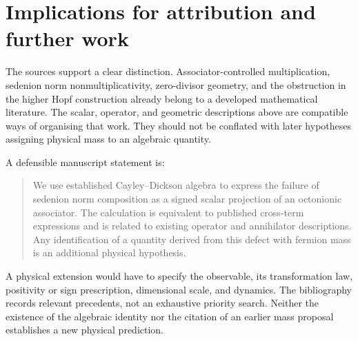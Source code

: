 \documentclass[11pt,a4paper]{article}
\numberwithin{equation}{section}
\begin{document}
\section{Implications for attribution and further work}

The sources support a clear distinction. Associator-controlled
multiplication, sedenion norm nonmultiplicativity, zero-divisor geometry,
and the obstruction in the higher Hopf construction already belong to
a developed mathematical literature. The scalar, operator, and
geometric descriptions above are compatible ways of organising that
work. They should not be conflated with later hypotheses assigning
physical mass to an algebraic quantity.
\citep{Moreno2005Constructing,Morita2014QuasiAssociativity,
BissDuggerIsaksen2008Annihilators,BissEtAl2009Eigentheory,Moreno2004Hopf}

\par{}
A defensible manuscript statement is:\nopagebreak
\begin{quote}
We use established Cayley--Dickson algebra to express the failure of
sedenion norm composition as a signed scalar projection of an
octonionic associator. The calculation is equivalent to published
cross-term expressions and is related to existing operator and
annihilator descriptions. Any identification of a quantity derived
from this defect with fermion mass is an additional physical
hypothesis.
\end{quote}

A physical extension would have to specify the observable, its
transformation law, positivity or sign prescription, dimensional scale,
and dynamics. The bibliography records relevant precedents, not an
exhaustive priority search. Neither the existence of the algebraic
identity nor the citation of an earlier mass proposal establishes a
new physical prediction.



\end{document}
